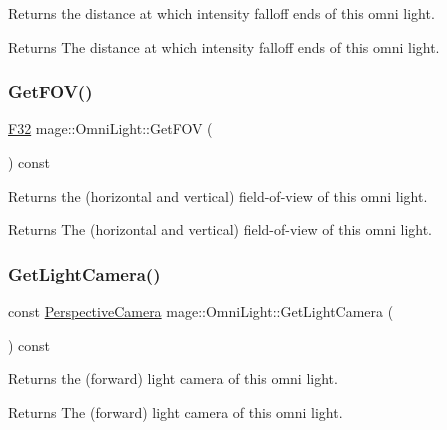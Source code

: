 Returns the distance at which intensity falloff ends of this omni light.

\begin{DoxyReturn}{Returns}
The distance at which intensity falloff ends of this omni light. 
\end{DoxyReturn}
\hypertarget{classmage_1_1_omni_light_a7a0bd82c0272a7eeeb33a9ede796bae1}{}\label{classmage_1_1_omni_light_a7a0bd82c0272a7eeeb33a9ede796bae1} 
\subsubsection{\texorpdfstring{Get\+F\+O\+V()}{GetFOV()}}
{\footnotesize\ttfamily \hyperlink{namespacemage_aa97e833b45f06d60a0a9c4fc22ae02c0}{F32} mage\+::\+Omni\+Light\+::\+Get\+F\+OV (\begin{DoxyParamCaption}{ }\end{DoxyParamCaption}) const\hspace{0.3cm}{\ttfamily [noexcept]}}

Returns the (horizontal and vertical) field-\/of-\/view of this omni light.

\begin{DoxyReturn}{Returns}
The (horizontal and vertical) field-\/of-\/view of this omni light. 
\end{DoxyReturn}
\hypertarget{classmage_1_1_omni_light_ac31708d7696a809bb75c75a85b14de80}{}\label{classmage_1_1_omni_light_ac31708d7696a809bb75c75a85b14de80} 
\subsubsection{\texorpdfstring{Get\+Light\+Camera()}{GetLightCamera()}}
{\footnotesize\ttfamily const \hyperlink{classmage_1_1_perspective_camera}{Perspective\+Camera} mage\+::\+Omni\+Light\+::\+Get\+Light\+Camera (\begin{DoxyParamCaption}{ }\end{DoxyParamCaption}) const\hspace{0.3cm}{\ttfamily [noexcept]}}

Returns the (forward) light camera of this omni light.

\begin{DoxyReturn}{Returns}
The (forward) light camera of this omni light. 
\end{DoxyReturn}
\hypertarget{classmage_1_1_omni_light_adf729b70a53ae97b054f0f2226590612}{}\label{classmage_1_1_omni_light_adf729b70a53ae97b054f0f2226590612} 
